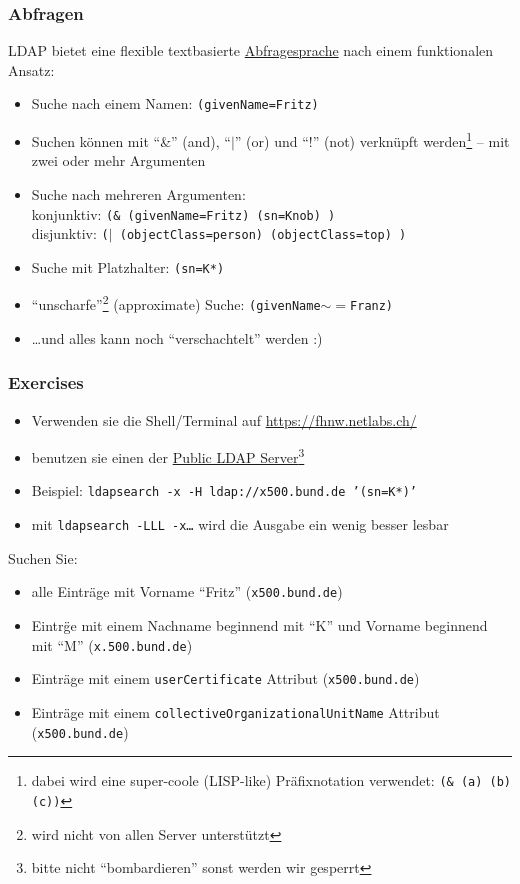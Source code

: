 \documentclass[ignorenonframetext]{beamer}
\begin{document}
\begin{frame}[fragile]
\frametitle{Abfragen}
LDAP bietet eine flexible textbasierte \href{https://ldap.com/ldap-filters/}{Abfragesprache} nach einem funktionalen Ansatz:
\begin{itemize}
  \item Suche nach einem Namen: \texttt{(givenName=Fritz)}
  \item Suchen k\"onnen mit ``\&'' (and), ``$\vert$'' (or) und ``!'' (not) verkn\"upft werden\footnote{dabei wird eine super-coole (LISP-like) Pr\"afixnotation verwendet: \texttt{(\& (a) (b) (c))}} -- mit zwei oder mehr Argumenten
  \item Suche nach mehreren Argumenten: \\konjunktiv: \texttt{(\& (givenName=Fritz) (sn=Knob) )} \\
  disjunktiv: \texttt{($\vert$ (objectClass=person) (objectClass=top) )} 
  \item Suche mit Platzhalter: \texttt{(sn=K*)}
  \item ``unscharfe''\footnote{wird nicht von allen Server unterst\"utzt} (approximate) Suche: \texttt{(givenName$\sim=$Franz)}
  \item \ldots und alles kann noch ``verschachtelt'' werden :)
\end{itemize} 
\end{frame}


\begin{frame}
\frametitle{Exercises}
\begin{itemize}
  \item Verwenden sie die Shell/Terminal auf \url{https://fhnw.netlabs.ch/}
  \item benutzen sie einen der \href{https://ldapwiki.com/wiki/Public\%20LDAP\%20Servers}{Public LDAP Server}\footnote{bitte nicht ``bombardieren'' sonst werden wir gesperrt}
  \item Beispiel: \texttt{ldapsearch -x -H ldap://x500.bund.de '(sn=K*)'}
  \item mit \texttt{ldapsearch -LLL -x\ldots} wird die Ausgabe ein wenig besser lesbar
\end{itemize} 
Suchen Sie:
\begin{itemize}
  \item alle Eintr\"age mit Vorname ``Fritz'' (\texttt{x500.bund.de})
  \item Eintr\"ge mit einem Nachname beginnend mit ``K'' und Vorname beginnend mit ``M'' (\texttt{x.500.bund.de})
  \item Eintr\"age mit einem \texttt{userCertificate} Attribut (\texttt{x500.bund.de})
  \item Eintr\"age mit einem \texttt{collectiveOrganizationalUnitName} Attribut (\texttt{x500.bund.de})
\end{itemize} 
\end{frame}
\end{document}
